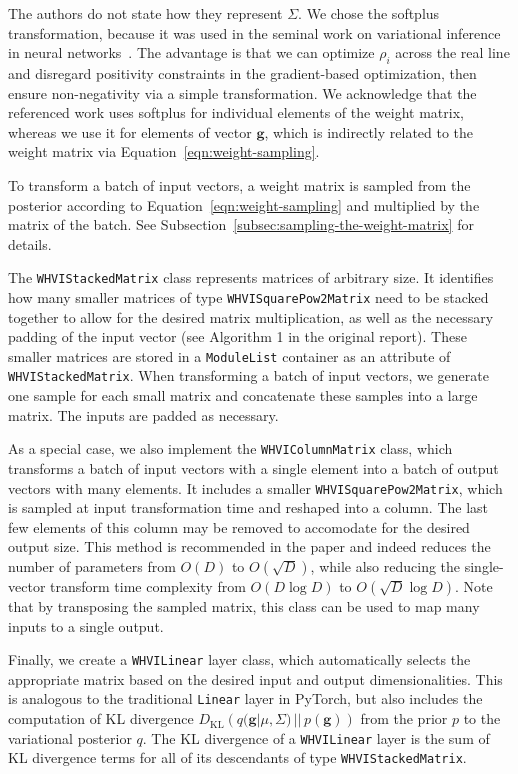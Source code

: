 \documentclass[11pt]{article}
\begin{document}
    The authors do not state how they represent $\Sigma$.
    We chose the softplus transformation, because it was used in the seminal work on variational inference in neural networks~\cite{blundell2015weight}.
    The advantage is that we can optimize $\rho_i$ across the real line and disregard positivity constraints in the gradient-based optimization, then ensure non-negativity via a simple transformation.
    We acknowledge that the referenced work uses softplus for individual elements of the weight matrix, whereas we use it for elements of vector $\mathbf{g}$, which is indirectly related to the weight matrix via Equation~\ref{eqn:weight-sampling}.

    To transform a batch of input vectors, a weight matrix is sampled from the posterior according to Equation~\ref{eqn:weight-sampling} and multiplied by the matrix of the batch. See Subsection~\ref{subsec:sampling-the-weight-matrix} for details.

    The \texttt{WHVIStackedMatrix} class represents matrices of arbitrary size.
    It identifies how many smaller matrices of type \texttt{WHVISquarePow2Matrix} need to be stacked together to allow for the desired matrix multiplication, as well as the necessary padding of the input vector (see Algorithm 1 in the original report).
    These smaller matrices are stored in a \texttt{ModuleList} container as an attribute of \texttt{WHVIStackedMatrix}. When transforming a batch of input vectors, we generate one sample for each small matrix and concatenate these samples into a large matrix. The inputs are padded as necessary.

    As a special case, we also implement the \texttt{WHVIColumnMatrix} class, which transforms a batch of input vectors with a single element into a batch of output vectors with many elements.
    It includes a smaller \texttt{WHVISquarePow2Matrix}, which is sampled at input transformation time and reshaped into a column.
    The last few elements of this column may be removed to accomodate for the desired output size.
    This method is recommended in the paper and indeed reduces the number of parameters from $O(D)$ to $O(\sqrt{D})$, while also reducing the single-vector transform time complexity from $O(D\log D)$ to $O(\sqrt{D}\log D)$.
    Note that by transposing the sampled matrix, this class can be used to map many inputs to a single output.

    Finally, we create a \texttt{WHVILinear} layer class, which automatically selects the appropriate matrix based on the desired input and output dimensionalities.
    This is analogous to the traditional \texttt{Linear} layer in PyTorch, but also includes the computation of KL divergence $D_\mathrm{KL}\left(q(\mathbf{g}|\mu, \Sigma)\, ||\, p(\mathbf{g})\right)$ from the prior $p$ to the variational posterior $q$.
    The KL divergence of a \texttt{WHVILinear} layer is the sum of KL divergence terms for all of its descendants of type \texttt{WHVIStackedMatrix}.
\end{document}
